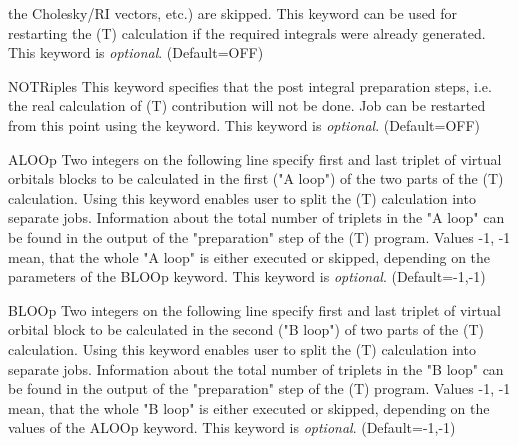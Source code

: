 \begin{keywordlist}
the Cholesky/RI vectors, etc.) are skipped. This keyword can be used for
restarting the (T) calculation if the required integrals were already generated.
This keyword is {\it optional}. (Default=OFF)
\item[NOTRiples]
This keyword specifies that the post integral preparation steps, i.e.
the real calculation of (T) contribution will not be done. Job can be restarted
from this point using the  keyword.
This keyword is {\it optional}. (Default=OFF)
\item[ALOOp]
Two integers on the following line specify first and last triplet of
virtual orbitals blocks to be calculated in the first ("A loop") of
the two parts of the (T) calculation. Using this keyword enables user
to split the (T) calculation into separate jobs. Information about
the total number of triplets in the "A loop" can be found in the
output of the "preparation" step of the (T) program. Values
-1, -1 mean, that the whole "A loop" is either executed or skipped,
depending on the parameters of the BLOOp keyword.
This keyword is {\it optional}. (Default=-1,-1)
\item[BLOOp]
Two integers on the following line specify first and last triplet of
virtual orbital block to be calculated in the second ("B loop") of
two parts of the (T) calculation. Using this keyword enables user
to split the (T) calculation into separate jobs. Information about
the total number of triplets in the "B loop" can be found in the
output of the "preparation" step of the (T) program. Values
-1, -1 mean, that the whole "B loop" is either executed or skipped,
depending on the values of the ALOOp keyword.
This keyword is {\it optional}. (Default=-1,-1)

\end{keywordlist}

